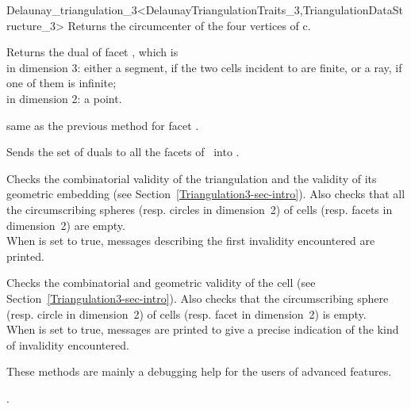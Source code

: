 \begin{ccRefClass}{Delaunay_triangulation_3<DelaunayTriangulationTraits_3,TriangulationDataStructure_3>}
{Returns the circumcenter of the four vertices of c.
}

{Returns the dual of facet , which is \\
in dimension 3: either a segment, if the two cells incident to   
are finite, or a ray, if one of them is infinite;\\
in dimension 2: a point.
}

{same as the previous method for facet .}

{Sends the set of duals to all the facets of \ccVar\ into .}


\begin{ccAdvanced}
{Checks the combinatorial validity of the triangulation and the
validity of its geometric embedding (see
Section~\ref{Triangulation3-sec-intro}). Also checks that all the
circumscribing spheres (resp. circles in dimension~2) of  cells
(resp. facets in dimension~2) are empty.\\ When  is set to
true,  messages describing the first invalidity encountered are
printed.}

{Checks the combinatorial and geometric validity of the cell (see
Section~\ref{Triangulation3-sec-intro}). Also checks that the
circumscribing sphere (resp. circle in dimension~2) of  cells
(resp. facet in dimension~2) is empty.\\
 When  is set to
true, messages are printed to give
a precise indication of the kind of invalidity encountered.}

These methods are  mainly a debugging help for the users of advanced features.
\end{ccAdvanced}

\ccSeeAlso

.



\end{ccRefClass}
